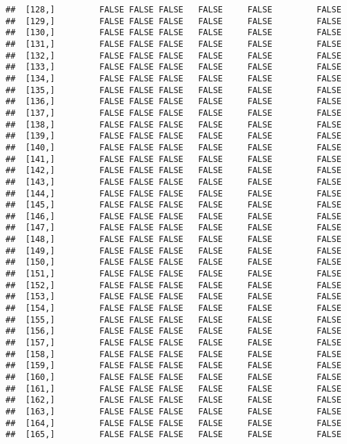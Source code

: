 \documentclass[
]{article}
\begin{document}
\begin{verbatim}
##  [128,]         FALSE FALSE FALSE   FALSE     FALSE         FALSE
##  [129,]         FALSE FALSE FALSE   FALSE     FALSE         FALSE
##  [130,]         FALSE FALSE FALSE   FALSE     FALSE         FALSE
##  [131,]         FALSE FALSE FALSE   FALSE     FALSE         FALSE
##  [132,]         FALSE FALSE FALSE   FALSE     FALSE         FALSE
##  [133,]         FALSE FALSE FALSE   FALSE     FALSE         FALSE
##  [134,]         FALSE FALSE FALSE   FALSE     FALSE         FALSE
##  [135,]         FALSE FALSE FALSE   FALSE     FALSE         FALSE
##  [136,]         FALSE FALSE FALSE   FALSE     FALSE         FALSE
##  [137,]         FALSE FALSE FALSE   FALSE     FALSE         FALSE
##  [138,]         FALSE FALSE FALSE   FALSE     FALSE         FALSE
##  [139,]         FALSE FALSE FALSE   FALSE     FALSE         FALSE
##  [140,]         FALSE FALSE FALSE   FALSE     FALSE         FALSE
##  [141,]         FALSE FALSE FALSE   FALSE     FALSE         FALSE
##  [142,]         FALSE FALSE FALSE   FALSE     FALSE         FALSE
##  [143,]         FALSE FALSE FALSE   FALSE     FALSE         FALSE
##  [144,]         FALSE FALSE FALSE   FALSE     FALSE         FALSE
##  [145,]         FALSE FALSE FALSE   FALSE     FALSE         FALSE
##  [146,]         FALSE FALSE FALSE   FALSE     FALSE         FALSE
##  [147,]         FALSE FALSE FALSE   FALSE     FALSE         FALSE
##  [148,]         FALSE FALSE FALSE   FALSE     FALSE         FALSE
##  [149,]         FALSE FALSE FALSE   FALSE     FALSE         FALSE
##  [150,]         FALSE FALSE FALSE   FALSE     FALSE         FALSE
##  [151,]         FALSE FALSE FALSE   FALSE     FALSE         FALSE
##  [152,]         FALSE FALSE FALSE   FALSE     FALSE         FALSE
##  [153,]         FALSE FALSE FALSE   FALSE     FALSE         FALSE
##  [154,]         FALSE FALSE FALSE   FALSE     FALSE         FALSE
##  [155,]         FALSE FALSE FALSE   FALSE     FALSE         FALSE
##  [156,]         FALSE FALSE FALSE   FALSE     FALSE         FALSE
##  [157,]         FALSE FALSE FALSE   FALSE     FALSE         FALSE
##  [158,]         FALSE FALSE FALSE   FALSE     FALSE         FALSE
##  [159,]         FALSE FALSE FALSE   FALSE     FALSE         FALSE
##  [160,]         FALSE FALSE FALSE   FALSE     FALSE         FALSE
##  [161,]         FALSE FALSE FALSE   FALSE     FALSE         FALSE
##  [162,]         FALSE FALSE FALSE   FALSE     FALSE         FALSE
##  [163,]         FALSE FALSE FALSE   FALSE     FALSE         FALSE
##  [164,]         FALSE FALSE FALSE   FALSE     FALSE         FALSE
##  [165,]         FALSE FALSE FALSE   FALSE     FALSE         FALSE

\end{verbatim}
\end{document}
